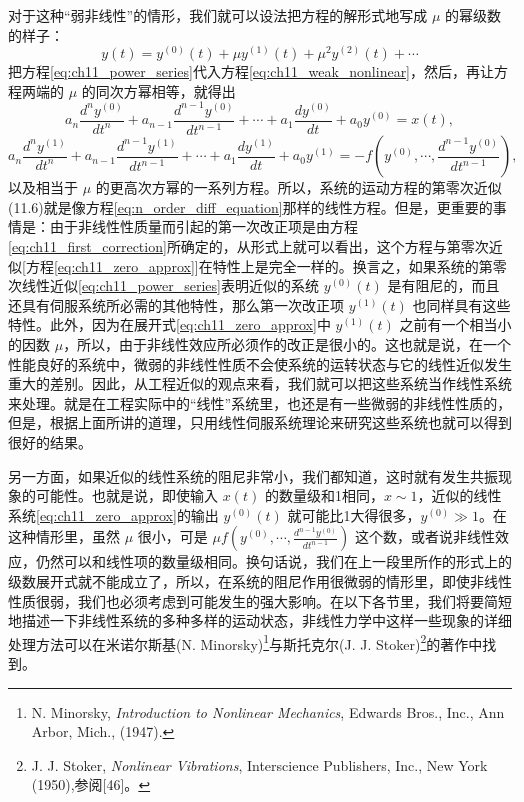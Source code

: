 对于这种“弱非线性”的情形，我们就可以设法把方程的解形式地写成 $\mu$ 的幂级数的样子：
\begin{equation}\label{eq:ch11_power_series}
y(t) = y^{(0)}(t) + \mu y^{(1)}(t) + \mu^2 y^{(2)}(t) + \cdots
\end{equation}
把方程\eqref{eq:ch11_power_series}代入方程\eqref{eq:ch11_weak_nonlinear}，然后，再让方程两端的 $\mu$ 的同次方幂相等，就得出
\begin{equation}\label{eq:ch11_zero_approx}
a_n \frac{d^n y^{(0)}}{dt^n} + a_{n-1} \frac{d^{n-1} y^{(0)}}{dt^{n-1}} + \cdots + a_1 \frac{dy^{(0)}}{dt} + a_0 y^{(0)} = x(t),
\end{equation}
\begin{equation}\label{eq:ch11_first_correction}
a_n \frac{d^n y^{(1)}}{dt^n} + a_{n-1} \frac{d^{n-1} y^{(1)}}{dt^{n-1}} + \cdots + a_1 \frac{dy^{(1)}}{dt} + a_0 y^{(1)} = -f \left( y^{(0)}, \cdots, \frac{d^{n-1} y^{(0)}}{dt^{n-1}} \right),
\end{equation}
以及相当于 $\mu$ 的更高次方幂的一系列方程。所以，系统的运动方程的第零次近似(11.6)就是像方程\eqref{eq:n_order_diff_equation}那样的线性方程。但是，更重要的事情是：由于非线性性质量而引起的第一次改正项是由方程\eqref{eq:ch11_first_correction}所确定的，从形式上就可以看出，这个方程与第零次近似[方程\eqref{eq:ch11_zero_approx}]在特性上是完全一样的。换言之，如果系统的第零次线性近似\eqref{eq:ch11_power_series}表明近似的系统 $y^{(0)}(t)$ 是有阻尼的，而且还具有伺服系统所必需的其他特性，那么第一次改正项 $y^{(1)}(t)$ 也同样具有这些特性。此外，因为在展开式\eqref{eq:ch11_zero_approx}中 $y^{(1)}(t)$ 之前有一个相当小的因数 $\mu$，所以，由于非线性效应所必须作的改正是很小的。这也就是说，在一个性能良好的系统中，微弱的非线性性质不会使系统的运转状态与它的线性近似发生重大的差别。因此，从工程近似的观点来看，我们就可以把这些系统当作线性系统来处理。就是在工程实际中的“线性”系统里，也还是有一些微弱的非线性性质的，但是，根据上面所讲的道理，只用线性伺服系统理论来研究这些系统也就可以得到很好的结果。

另一方面，如果近似的线性系统的阻尼非常小，我们都知道，这时就有发生共振现象的可能性。也就是说，即使输入 $x(t)$ 的数量级和1相同，$x \sim 1$，近似的线性系统\eqref{eq:ch11_zero_approx}的输出 $y^{(0)}(t)$ 就可能比1大得很多，$y^{(0)} \gg 1$。在这种情形里，虽然 $\mu$ 很小，可是 $\mu f \left( y^{(0)}, \cdots, \frac{d^{n-1} y^{(0)}}{d t^{n-1}} \right)$ 这个数，或者说非线性效应，仍然可以和线性项的数量级相同。换句话说，我们在上一段里所作的形式上的级数展开式就不能成立了，所以，在系统的阻尼作用很微弱的情形里，即使非线性性质很弱，我们也必须考虑到可能发生的强大影响。在以下各节里，我们将要简短地描述一下非线性系统的多种多样的运动状态，非线性力学中这样一些现象的详细处理方法可以在米诺尔斯基(N. Minorsky)\footnote{N. Minorsky, \textit{Introduction to Nonlinear Mechanics}, Edwards Bros., Inc., Ann Arbor, Mich., (1947).}与斯托克尔(J. J. Stoker)\footnote{J. J. Stoker, \textit{Nonlinear Vibrations}, Interscience Publishers, Inc., New York (1950),参阅[46]。}的著作中找到。


